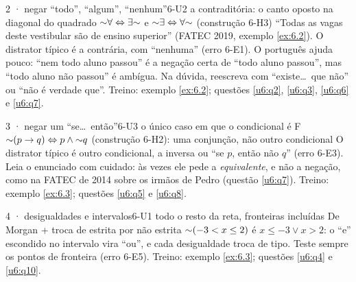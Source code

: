 \begin{caso}{2 · negar \enquote{todo}, \enquote{algum}, \enquote{nenhum}}{6-U2}
{a contraditória: o canto oposto na diagonal do quadrado}
{${{\sim}}\forall\Leftrightarrow\exists{{\sim}}$ e ${{\sim}}\exists\Leftrightarrow\forall{{\sim}}$ (construção 6-H3)}
\reconhecer \enquote{Todas as vagas deste vestibular são de ensino superior} (FATEC 2019, exemplo \ref{ex:6.2}). O distrator típico é a contrária, com \enquote{nenhuma} (erro 6-E1). O português ajuda pouco: \enquote{nem todo aluno passou} é a negação certa de \enquote{todo aluno passou}, mas \enquote{todo aluno não passou} é ambígua. Na dúvida, reescreva com \enquote{existe\ldots\ que não} ou \enquote{não é verdade que}. Treino: exemplo \ref{ex:6.2}; questões \ref{u6:q2}, \ref{u6:q3}, \ref{u6:q6} e \ref{u6:q7}.
\end{caso}

\begin{caso}{3 · negar um \enquote{se\ldots\ então}}{6-U3}
{o único caso em que o condicional é F}
{${{\sim}}(p\rightarrow q)\Leftrightarrow p\wedge{{\sim}}q$ (construção 6-H2): uma conjunção, não outro condicional}
\reconhecer O distrator típico é outro condicional, a inversa ou \enquote{se $p$, então não $q$} (erro 6-E3). Leia o enunciado com cuidado: às vezes ele pede a \emph{equivalente}, e não a negação, como na FATEC de 2014 sobre os irmãos de Pedro (questão \ref{u6:q7}). Treino: exemplo \ref{ex:6.3}; questões \ref{u6:q5} e \ref{u6:q8}.
\end{caso}

\begin{caso}{4 · desigualdades e intervalos}{6-U1}
{todo o resto da reta, fronteiras incluídas}
{De Morgan + troca de estrita por não estrita}
\reconhecer ${{\sim}}(-3<x\le2)$ é $x\le-3\vee x>2$: o \enquote{e} escondido no intervalo vira \enquote{ou}, e cada desigualdade troca de tipo. Teste sempre os pontos de fronteira (erro 6-E5). Treino: exemplo \ref{ex:6.3}; questões \ref{u6:q4} e \ref{u6:q10}.
\end{caso}

